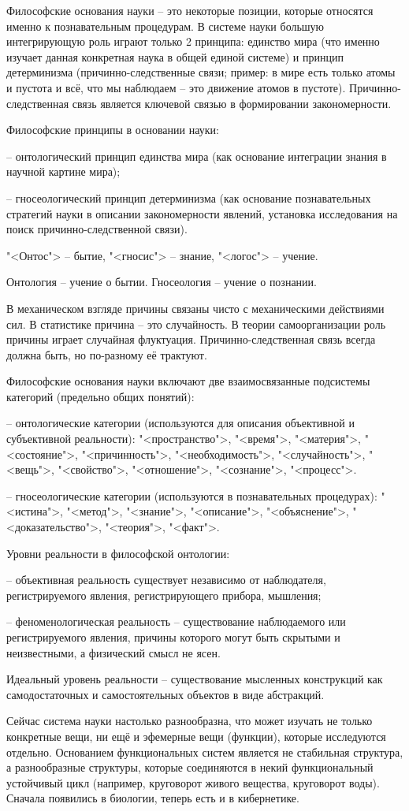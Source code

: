 \documentclass[exam_answers.tex]{subfiles}
\begin{document}
\renewcommand{\baselinestretch}{0.75}

Философские основания науки – это некоторые позиции, которые относятся именно к познавательным процедурам. В системе науки большую интегрирующую роль играют только 2 принципа: единство мира (что именно изучает данная конкретная наука в общей единой системе) и принцип детерминизма (причинно-следственные связи; пример: в мире есть только атомы и пустота и всё, что мы наблюдаем – это движение атомов в пустоте). Причинно-следственная связь является ключевой связью в формировании закономерности.

Философские принципы в основании науки:

-- онтологический принцип единства мира (как основание интеграции знания в научной картине мира);

-- гносеологический принцип детерминизма (как основание познавательных стратегий науки в описании закономерности явлений, установка исследования на поиск причинно-следственной связи).

"<Онтос"> -- бытие, "<гносис"> -- знание, "<логос"> -- учение.

Онтология – учение о бытии. Гносеология – учение о познании.

В механическом взгляде причины связаны чисто с механическими действиями сил. В статистике причина – это случайность. В теории самоорганизации роль причины играет случайная флуктуация. Причинно-следственная связь всегда должна быть, но по-разному её трактуют.

Философские основания науки включают две взаимосвязанные подсистемы категорий (предельно общих понятий):

-- онтологические категории (используются для описания объективной и субъективной реальности): "<пространство">, "<время">, "<материя">, "<состояние">, "<причинность">, "<необходимость">, "<случайность">, "<вещь">, "<свойство">, "<отношение">, "<сознание">, "<процесс">.

-- гносеологические категории (используются в познавательных процедурах): "<истина">, "<метод">, "<знание">, "<описание">, "<объяснение">, "<доказательство">, "<теория">, "<факт">.

Уровни реальности в философской онтологии:

-- объективная реальность существует независимо от наблюдателя, регистрируемого явления, регистрирующего прибора, мышления;

-- феноменологическая реальность – существование наблюдаемого или регистрируемого явления, причины которого могут быть скрытыми и неизвестными, а физический смысл не ясен.

Идеальный уровень реальности – существование мысленных конструкций как самодостаточных и самостоятельных объектов в виде абстракций.

Сейчас система науки настолько разнообразна, что может изучать не только конкретные вещи, ни ещё и эфемерные вещи (функции), которые исследуются отдельно.
Основанием функциональных систем является не стабильная структура, а разнообразные структуры, которые соединяются в некий функциональный устойчивый цикл (например, круговорот живого вещества, круговорот воды).
Сначала появились в биологии, теперь есть и в кибернетике.
\end{document}
